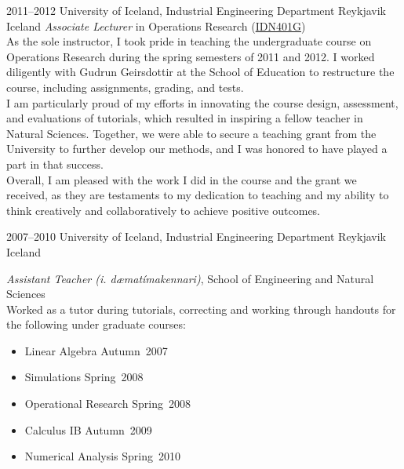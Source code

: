 \documentclass[]{cv} %
\begin{document}
\begin{entrylist}
    \entry
    {2011--2012}
    {University of Iceland, Industrial Engineering Department}
    {Reykjavik Iceland}
    {\emph{Associate Lecturer} in Operations Research (\href{https://ugla.hi.is/kennsluskra/index.php?sid=&tab=nam&chapter=namskeid&id=08213020110}{IDN401G})\\
    As the sole instructor, I took pride in teaching the undergraduate course on Operations Research during the spring semesters of 2011 and 2012. I worked diligently with Gudrun Geirsdottir at the School of Education to restructure the course, including assignments, grading, and tests.\\
    I am particularly proud of my efforts in innovating the course design, assessment, and evaluations of tutorials, which resulted in inspiring a fellow teacher in Natural Sciences. Together, we were able to secure a teaching grant from the University to further develop our methods, and I was honored to have played a part in that success.\\
    Overall, I am pleased with the work I did in the course and the grant we received, as they are testaments to my dedication to teaching and my ability to think creatively and collaboratively to achieve positive outcomes.
    }

    \entry
    {2007--2010}
    {University of Iceland, Industrial Engineering Department}
    {Reykjavik Iceland}
    {\emph{Assistant Teacher (i. dæmatímakennari)}, School of Engineering and 
    Natural Sciences \\
        Worked as a tutor during tutorials, correcting and working through 
        handouts for the following under graduate courses: 
        \begin{itemize}
            \item Linear Algebra 		\hfill Autumn~2007
            \item Simulations			\hfill Spring~2008
            \item Operational Research 	\hfill Spring~2008
            \item Calculus IB			\hfill Autumn~2009
            \item Numerical Analysis 	\hfill Spring~2010
        \end{itemize}	
    }
\end{entrylist}   
\end{document}
